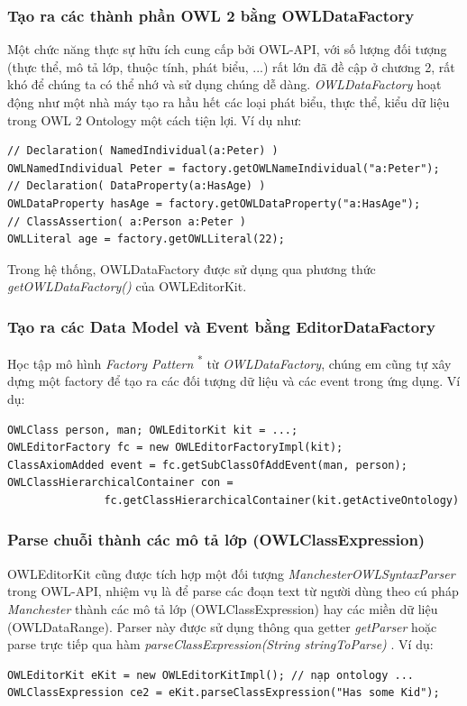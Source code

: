 {\subsubsection{Tạo ra các thành phần OWL 2 bằng OWLDataFactory}
Một chức năng thực sự hữu ích cung cấp bởi OWL-API, với số lượng đối tượng (thực thể, mô tả lớp, thuộc tính, phát biểu, ...) rất lớn đã đề cập ở chương 2, rất khó để chúng ta có thể nhớ và sử dụng chúng dễ dàng. \textit{OWLDataFactory} hoạt động như một nhà máy tạo ra hầu hết các loại phát biểu, thực thể, kiểu dữ liệu trong OWL 2 Ontology một cách tiện lợi. Ví dụ như:
\begin{verbatim}
// Declaration( NamedIndividual(a:Peter) )
OWLNamedIndividual Peter = factory.getOWLNameIndividual("a:Peter");
// Declaration( DataProperty(a:HasAge) )
OWLDataProperty hasAge = factory.getOWLDataProperty("a:HasAge");
// ClassAssertion( a:Person a:Peter )
OWLLiteral age = factory.getOWLLiteral(22);
\end{verbatim}
Trong hệ thống, OWLDataFactory được sử dụng qua phương thức \textit{getOWLDataFactory()} của OWLEditorKit.

\subsubsection{Tạo ra các Data Model và Event bằng EditorDataFactory}
{\let\thefootnote\relax{}
}
Học tập mô hình \textit{Factory Pattern} \textsuperscript{*} từ \textit{OWLDataFactory}, chúng em cũng tự xây dựng một factory để tạo ra các đối tượng dữ liệu và các event trong ứng dụng. Ví dụ:
\begin{verbatim}
OWLClass person, man; OWLEditorKit kit = ...; 
OWLEditorFactory fc = new OWLEditorFactoryImpl(kit);
ClassAxiomAdded event = fc.getSubClassOfAddEvent(man, person);
OWLClassHierarchicalContainer con = 
               fc.getClassHierarchicalContainer(kit.getActiveOntology)
\end{verbatim}

\subsubsection{Parse chuỗi thành các mô tả lớp (OWLClassExpression)}
OWLEditorKit cũng được tích hợp một đối tượng \textit{ManchesterOWLSyntaxParser} trong OWL-API, nhiệm vụ là để parse các đoạn text từ người dùng theo cú pháp \textit{Manchester} thành các mô tả lớp (OWLClassExpression) hay các miền dữ liệu (OWLDataRange). Parser này được sử dụng thông qua getter \textit{getParser} hoặc parse trực tiếp qua hàm \textit{parseClassExpression(String stringToParse)} . Ví dụ:
\begin{verbatim}
OWLEditorKit eKit = new OWLEditorKitImpl(); // nạp ontology ...
OWLClassExpression ce2 = eKit.parseClassExpression("Has some Kid");
\end{verbatim}

}
